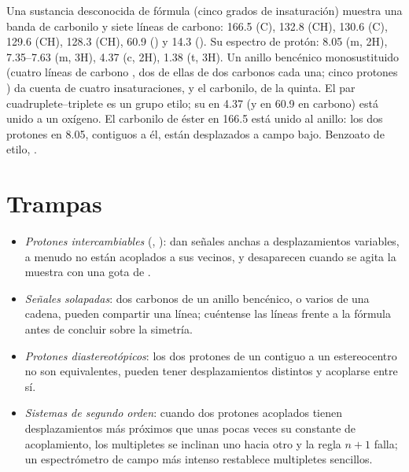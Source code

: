 \begin{example}\label{ex:b2:structure-determination:ester}
Una sustancia desconocida de fórmula  (cinco grados de insaturación) muestra una banda de carbonilo y siete
líneas de carbono: 166.5 (C), 132.8 (CH), 130.6 (C), 129.6 (CH), 128.3 (CH), 60.9 () y 14.3
(). Su espectro de protón: 8.05 (m, 2H), 7.35--7.63 (m, 3H), 4.37 (c, 2H), 1.38 (t, 3H). Un
anillo bencénico monosustituido (cuatro líneas de carbono , dos de ellas de dos carbonos cada una; cinco
protones ) da cuenta de cuatro insaturaciones, y el carbonilo, de la quinta. El par cuadruplete--triplete
es un grupo etilo; su  en 4.37 (y en 60.9 en carbono) está unido a un oxígeno. El carbonilo de éster
en 166.5 está unido al anillo: los dos protones en 8.05, contiguos a él, están desplazados a campo bajo. Benzoato de
etilo, .
\end{example}

\section{Trampas}

\begin{itemize}
  \item \emph{Protones intercambiables} (, ): dan señales anchas a desplazamientos variables, a
        menudo no están acoplados a sus vecinos, y desaparecen cuando se agita la muestra con una gota de .
  \item \emph{Señales solapadas}: dos carbonos de un anillo bencénico, o varios  de una cadena, pueden
        compartir una línea; cuéntense las líneas frente a la fórmula antes de concluir sobre la simetría.
  \item \emph{Protones diastereotópicos}: los dos protones de un  contiguo a un estereocentro no son
        equivalentes, pueden tener desplazamientos distintos y acoplarse entre sí.
  \item \emph{Sistemas de segundo orden}: cuando dos protones acoplados tienen desplazamientos más próximos que unas pocas veces su
        constante de acoplamiento, los multipletes se inclinan uno hacia otro y la regla $n+1$ falla; un
        espectrómetro de campo más intenso restablece multipletes sencillos.
\end{itemize}

